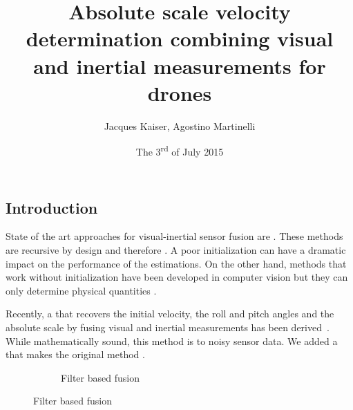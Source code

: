 \documentclass[final]{beamer}
\title
[ARSO, 1 - 3 July 2015, Lyon, France] %
{ %
Absolute scale velocity determination combining visual and inertial measurements for drones
}
\author{ %
Jacques Kaiser, Agostino Martinelli
}
\institute
[INRIA] %
{
  Team Chroma, INRIA
}
\date{The 3\textsuperscript{rd} of July 2015}
\begin{document}
\begin{frame}[t]
\begin{multicols}{3}

\section{Introduction}

State of the art approaches for visual-inertial sensor fusion are .
These methods are recursive by design and therefore .
A poor initialization can have a
dramatic impact on the performance of the estimations.
On the other hand, methods that work without initialization have been developed in computer vision but
they can only determine physical quantities .

Recently, a  that recovers the initial velocity, the roll and pitch angles and the absolute scale by fusing visual and inertial measurements has been derived~\cite{Martinelli2014,Martinelli2012}.
While mathematically sound, this method is  to noisy sensor data.
We added a  that makes the original method .



\begin{figure}
  \centering
  \hspace*{-1em}
  \begin{subfigure}[t]{0.3\columnwidth}
    \caption{Filter based fusion}
    \hspace*{-2em}
\end{subfigure}
\end{figure}
\end{multicols}
\end{frame}
\end{document}
